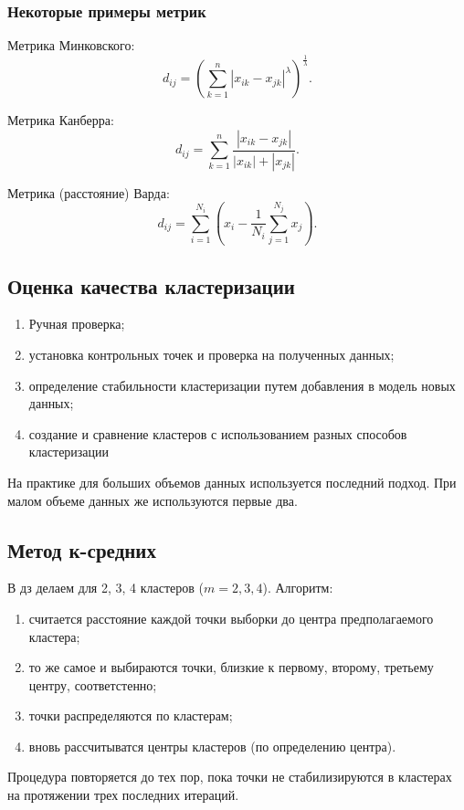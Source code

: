 \documentclass[12pt]{article}
\begin{document}
\subsubsection{Некоторые примеры метрик}
Метрика Минковского:
\[ d_{ij} = \left( \sum_{k=1}^n | x_{ik} - x_{jk} |^{\lambda} \right)^{\frac{1}{\lambda}}. \]

Метрика Канберра:
\[ d_{ij} = \sum_{k=1}^n\frac{|x_{ik} - x_{jk}|}{|x_{ik}| + |x_{jk}|}.\]

Метрика (расстояние) Варда:
\[ d_{ij} = \sum_{i=1}^{N_i} \left( x_i - \frac{1}{N_i} \sum_{j=1}^{N_j} x_j \right).\]

\subsection{Оценка качества кластеризации}
\begin{enumerate}
    \item Ручная проверка;
    \item установка контрольных точек и проверка на полученных данных;
    \item определение стабильности кластеризации путем добавления в модель новых данных;
    \item создание и сравнение кластеров с использованием разных способов кластеризации  
\end{enumerate}

На практике для больших объемов данных используется последний подход. При малом объеме данных же используются первые два.

\subsection{Метод к-средних}
В дз делаем для 2, 3, 4 кластеров ($m = 2, 3, 4$). Алгоритм:
\begin{enumerate}
    \item считается расстояние каждой точки выборки до центра предполагаемого кластера;
    \item то же самое и выбираются точки, близкие к первому, второму, третьему центру, соответстенно;
    \item точки распределяются по кластерам;
    \item вновь рассчитыватся центры кластеров (по определению центра).
\end{enumerate}
Процедура повторяется до тех пор, пока точки не стабилизируются в кластерах на протяжении трех последних итераций.\\
\end{document}
